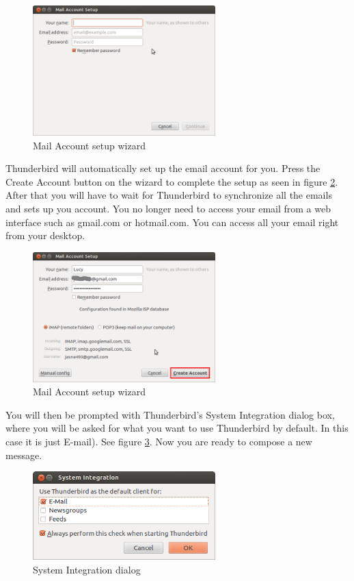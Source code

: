 \begin{figure}[h!]	
	\centering
	\includegraphics[width=200pt]{./images/basic-tasks/thunderbird2.png}
	\caption{Mail Account setup wizard}	
	\label{fig:thunderbird2}		
\end{figure}

\par \noindent Thunderbird will automatically set up the email account for you. Press the Create Account button on the wizard to complete the setup as seen in figure \ref{fig:thunderbird3}. After that you will have to wait for Thunderbird to synchronize all the emails and sets up you account. You no longer need to access your email from a web interface such as gmail.com or hotmail.com. You can access all your email right from your desktop. \\

\begin{figure}[h!]	
	\centering
	\includegraphics[width=200pt]{./images/basic-tasks/thunderbird3.png}
	\caption{Mail Account setup wizard}	
	\label{fig:thunderbird3}		
\end{figure}

\par \noindent You will then be prompted with Thunderbird's System Integration dialog box, where you will be asked for what you want to use Thunderbird by default. In this case it is just E-mail). See figure \ref{fig:thunderbird4}. Now you are ready to compose a new message. \\

\begin{figure}[h!]	
	\centering
	\includegraphics[width=200pt]{./images/basic-tasks/thunderbird4.png}
	\caption{System Integration dialog}	
	\label{fig:thunderbird4}		
\end{figure}

